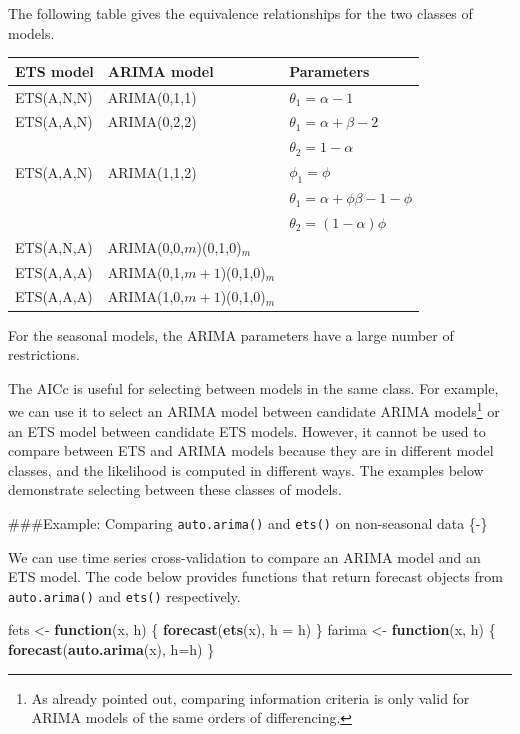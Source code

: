 \documentclass[]{book}
\newenvironment{Shaded}{\begin{snugshade}}{\end{snugshade}}
\newcommand{\ControlFlowTok}[1]{\textcolor[rgb]{0.13,0.29,0.53}{\textbf{#1}}}
\newcommand{\DataTypeTok}[1]{\textcolor[rgb]{0.13,0.29,0.53}{#1}}
\newcommand{\KeywordTok}[1]{\textcolor[rgb]{0.13,0.29,0.53}{\textbf{#1}}}
\newcommand{\NormalTok}[1]{#1}
\newcommand{\StringTok}[1]{\textcolor[rgb]{0.31,0.60,0.02}{#1}}
\let\rmarkdownfootnote\footnote%
\def\footnote{\protect\rmarkdownfootnote}
\begin{document}
The following table gives the equivalence relationships for the two classes of models.

\begin{longtable}[]{@{}lll@{}}
\toprule
\textbf{ETS model} & \textbf{ARIMA model} & \textbf{Parameters}\tabularnewline
\midrule
\endhead
ETS(A,N,N) & ARIMA(0,1,1) & \(\theta_1 = \alpha-1\)\tabularnewline
ETS(A,A,N) & ARIMA(0,2,2) & \(\theta_1 = \alpha+\beta-2\)\tabularnewline
& & \(\theta_2 = 1-\alpha\)\tabularnewline
ETS(A,A,N) & ARIMA(1,1,2) & \(\phi_1=\phi\)\tabularnewline
& & \(\theta_1 = \alpha+\phi\beta-1-\phi\)\tabularnewline
& & \(\theta_2 = (1-\alpha)\phi\)\tabularnewline
ETS(A,N,A) & ARIMA(0,0,\(m\))(0,1,0)\(_m\) &\tabularnewline
ETS(A,A,A) & ARIMA(0,1,\(m+1\))(0,1,0)\(_m\) &\tabularnewline
ETS(A,A,A) & ARIMA(1,0,\(m+1\))(0,1,0)\(_m\) &\tabularnewline
\bottomrule
\end{longtable}

For the seasonal models, the ARIMA parameters have a large number of restrictions.

The AICc is useful for selecting between models in the same class. For example, we can use it to select an ARIMA model between candidate ARIMA models\footnote{As already pointed out, comparing information criteria is only valid for ARIMA models of the same orders of differencing.} or an ETS model between candidate ETS models. However, it cannot be used to compare between ETS and ARIMA models because they are in different model classes, and the likelihood is computed in different ways. The examples below demonstrate selecting between these classes of models.

\#\#\#Example: Comparing \texttt{auto.arima()} and \texttt{ets()} on non-seasonal data \{-\}

We can use time series cross-validation to compare an ARIMA model and an ETS model. The code below provides functions that return forecast objects from \texttt{auto.arima()} and \texttt{ets()} respectively.

\begin{Shaded}
\begin{Highlighting}[]
\NormalTok{fets <-}\StringTok{ }\ControlFlowTok{function}\NormalTok{(x, h) \{}
  \KeywordTok{forecast}\NormalTok{(}\KeywordTok{ets}\NormalTok{(x), }\DataTypeTok{h =}\NormalTok{ h)}
\NormalTok{\}}
\NormalTok{farima <-}\StringTok{ }\ControlFlowTok{function}\NormalTok{(x, h) \{}
  \KeywordTok{forecast}\NormalTok{(}\KeywordTok{auto.arima}\NormalTok{(x), }\DataTypeTok{h=}\NormalTok{h)}
\NormalTok{\}}
\end{Highlighting}
\end{Shaded}
\end{document}
